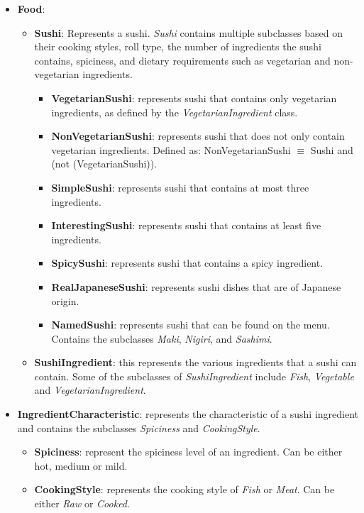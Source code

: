 \documentclass[a4paper]{article}
\theoremstyle{plain}
\theoremstyle{definition}
\begin{document}
    \begin{itemize}
        \item \textbf{Food}:
        \begin{itemize}
            \item \textbf{Sushi}: Represents a sushi. \textit{Sushi} contains multiple subclasses based on their cooking styles, roll type, the number of ingredients the sushi contains, spiciness, and dietary requirements such as vegetarian and non-vegetarian ingredients.
            \begin{itemize}
                \item \textbf{VegetarianSushi}: represents sushi that contains only vegetarian ingredients, as defined by the \textit{VegetarianIngredient} class.
                \item \textbf{NonVegetarianSushi}: represents sushi that does not only contain vegetarian ingredients. Defined as: NonVegetarianSushi $\equiv$ Sushi and (not (VegetarianSushi)).
                \item \textbf{SimpleSushi}: represents sushi that contains at most three ingredients.
                \item \textbf{InterestingSushi}: represents sushi that contains at least five ingredients.
                \item \textbf{SpicySushi}: represents sushi that contains a spicy ingredient. 
                \item \textbf{RealJapaneseSushi}: represents sushi dishes that are of Japanese origin.
                \item \textbf{NamedSushi}: represents sushi that can be found on the menu. Contains the subclasses \textit{Maki}, \textit{Nigiri}, and \textit{Sashimi}.
            \end{itemize}
            \item \textbf{SushiIngredient}: this represents the various ingredients that a sushi can contain. Some of the subclasses of \textit{SushiIngredient} include \textit{Fish}, \textit{Vegetable} and \textit{VegetarianIngredient}.
        \end{itemize}
        \item \textbf{IngredientCharacteristic}: represents the characteristic of a sushi ingredient and contains the subclasses \textit{Spiciness} and \textit{CookingStyle}.
        \begin{itemize}
            \item \textbf{Spiciness}: represent the spiciness level of an ingredient. Can be either hot, medium or mild.
            \item \textbf{CookingStyle}: represents the cooking style of \textit{Fish} or \textit{Meat}. Can be either \textit{Raw} or \textit{Cooked}.
        \end{itemize}
    \end{itemize}
    
\end{document}
